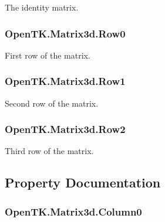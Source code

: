 The identity matrix. 

\hypertarget{struct_open_t_k_1_1_matrix3d_a2c616fb0267321624e19c5fa1ed13f74}{
\subsubsection[{Row0}]{ Open\-T\-K.\-Matrix3d.\-Row0}}\label{struct_open_t_k_1_1_matrix3d_a2c616fb0267321624e19c5fa1ed13f74}


First row of the matrix. 

\hypertarget{struct_open_t_k_1_1_matrix3d_ad32f2af61903b2b8893492334e779351}{
\subsubsection[{Row1}]{ Open\-T\-K.\-Matrix3d.\-Row1}}\label{struct_open_t_k_1_1_matrix3d_ad32f2af61903b2b8893492334e779351}


Second row of the matrix. 

\hypertarget{struct_open_t_k_1_1_matrix3d_a22cab640b562a8d0ce92adb1842421d1}{
\subsubsection[{Row2}]{ Open\-T\-K.\-Matrix3d.\-Row2}}\label{struct_open_t_k_1_1_matrix3d_a22cab640b562a8d0ce92adb1842421d1}


Third row of the matrix. 



\subsection{Property Documentation}
\hypertarget{struct_open_t_k_1_1_matrix3d_a365bc1ca87efb0a417454fc664df508f}{
\subsubsection[{Column0}]{ Open\-T\-K.\-Matrix3d.\-Column0\hspace{0.3cm}{\ttfamily [get]}}}\label{struct_open_t_k_1_1_matrix3d_a365bc1ca87efb0a417454fc664df508f}


